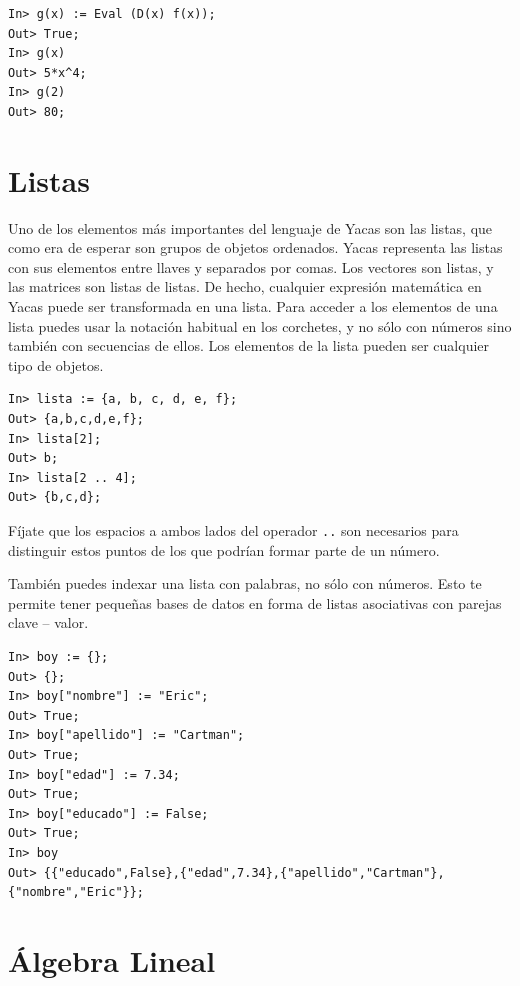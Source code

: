 \begin{verbatim}
In> g(x) := Eval (D(x) f(x));
Out> True;
In> g(x)
Out> 5*x^4;
In> g(2)
Out> 80;
\end{verbatim}



\section{Listas}


Uno de  los elementos más  importantes del  lenguaje de Yacas  son las
listas, que como era de esperar son grupos de objetos ordenados. Yacas
representa las listas  con sus elementos entre llaves  y separados por
comas.  Los  vectores  son  listas,  y  las  matrices  son  listas  de
listas. De  hecho, cualquier expresión  matemática en Yacas  puede ser
transformada en una  lista. Para acceder a los elementos  de una lista
puedes  usar la  notación habitual  en los  corchetes, y  no sólo  con
números  sino también  con secuencias  de ellos.  Los elementos  de la
lista pueden ser cualquier tipo de objetos.

\begin{verbatim}
In> lista := {a, b, c, d, e, f};
Out> {a,b,c,d,e,f};
In> lista[2];
Out> b;
In> lista[2 .. 4];
Out> {b,c,d};
\end{verbatim}

Fíjate  que los  espacios a  ambos  lados del  operador \verb+..+  son
necesarios  para distinguir  estos puntos  de los  que podrían  formar
parte de un número.

También puedes  indexar una lista  con palabras, no sólo  con números.
Esto  te permite  tener pequeñas  bases de  datos en  forma de  listas
asociativas con parejas clave -- valor.

\begin{verbatim}
In> boy := {};
Out> {};
In> boy["nombre"] := "Eric";
Out> True;
In> boy["apellido"] := "Cartman";
Out> True;
In> boy["edad"] := 7.34;
Out> True;
In> boy["educado"] := False;
Out> True;
In> boy
Out> {{"educado",False},{"edad",7.34},{"apellido","Cartman"},
{"nombre","Eric"}};
\end{verbatim}



\section{Álgebra Lineal}


